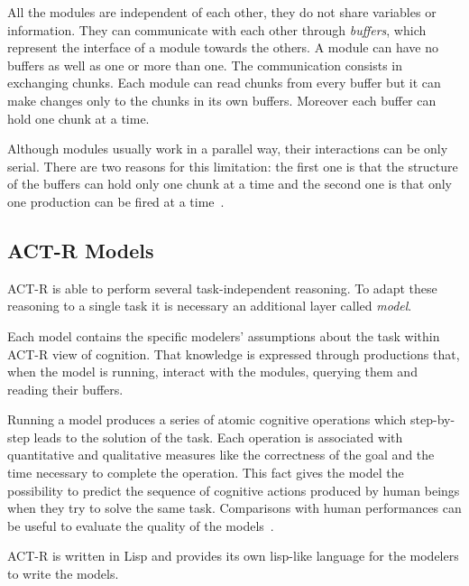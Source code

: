 	
		All the modules are independent of each other, they do not share variables or information. They can communicate with each other through \emph{buffers}, which represent the interface of a module towards the others. A module can have no buffers as well as one or more than one. The communication consists in exchanging chunks. Each module can read chunks from every buffer but it can make changes only to the chunks in its own buffers. Moreover each buffer can hold one chunk at a time. 

		Although modules usually work in a parallel way, their interactions can be only serial.
		There are two reasons for this limitation: the first one is that the structure of the buffers can hold only one chunk at a time and the second one is that only one production can be fired at a time~\cite{actr6refman}.
	
	\subsection{ACT-R Models}\label{modelSect}
	ACT-R is able to perform several task-independent reasoning. 
	To adapt these reasoning to a single task it is necessary an additional layer called \emph{model}.

	Each model contains the specific modelers' assumptions about the task within ACT-R view of cognition. That knowledge is expressed through productions that, when the model is running, interact with the modules, querying them and reading their buffers. 
	
	Running a model produces a series of atomic cognitive operations which step-by-step leads to the solution of the task. Each operation is associated with quantitative and qualitative measures like the correctness of the goal and the time necessary to complete the operation.
	This fact gives the model the possibility to predict the sequence of cognitive actions produced by human beings when they try to solve the same task.
	Comparisons with human performances can be useful to evaluate the quality of the models~\cite{Sears2012}.

	ACT-R is written in Lisp and provides its own lisp-like language for the modelers to write the models.



		

